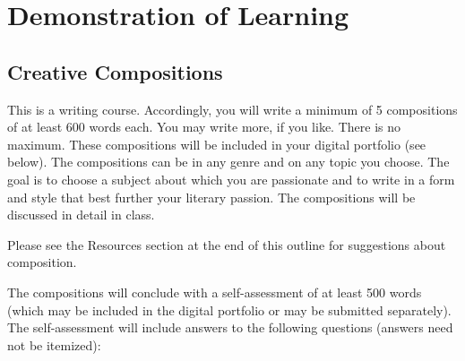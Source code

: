 \documentclass[letterpaper,10pt,headsepline]{scrreprt}
\begin{document}
\clearpage

\section{Demonstration of Learning}

\subsection{Creative Compositions}

This is a writing course. Accordingly, you will write a minimum of 5 compositions of at least 600 words each. You may write more, if you like. There is no maximum. These compositions will be included in your digital portfolio (see below). The compositions can be in any genre and on any topic you choose. The goal is to choose a subject about which you are passionate and to write in a form and style that best further your literary passion. The compositions will be discussed in detail in class.

Please see the Resources section at the end of this outline for suggestions about composition.

The compositions will conclude with a self-assessment of at least 500 words (which may be included in the digital portfolio or may be submitted separately). The self-assessment will include answers to the following questions (answers need not be itemized): 
\end{document}
